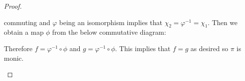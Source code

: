 \documentclass{article}
\begin{document}
\begin{proof}
\begin{enumerate}
\begin{center}
    \end{center}
    commuting and $\varphi$ being an isomorphism implies that $\chi_2=\varphi^{-1}=\chi_1$.
    Then we obtain a map $\phi$ from the below commutative diagram:
    \begin{center}
    \end{center}
    Therefore $f=\varphi^{-1}\circ \phi$ and $g=\varphi^{-1}\circ \phi$. This implies that $f=g$ as desired so $\pi$ is monic.
    \end{enumerate}
\end{proof}
\end{document}
